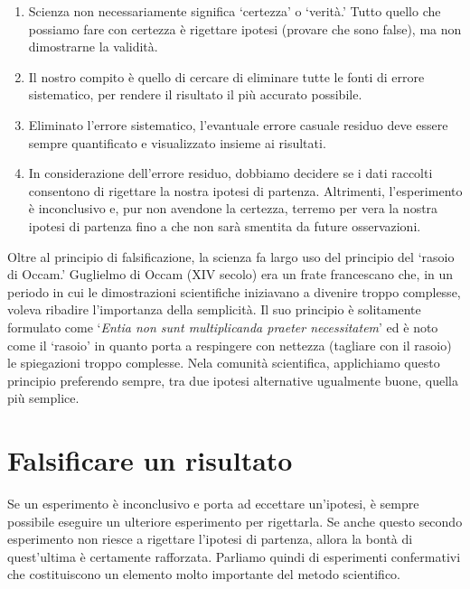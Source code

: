 \documentclass[a4paper,12pt,oneside]{book}
\providecommand{\tightlist}{%
  \setlength{\itemsep}{0pt}\setlength{\parskip}{0pt}}
\begin{document}
\begin{enumerate}
\def\labelenumi{\arabic{enumi}.}
\tightlist
\item
  Scienza non necessariamente significa `certezza' o `verità.' Tutto quello che possiamo fare con certezza è rigettare ipotesi (provare che sono false), ma non dimostrarne la validità.
\item
  Il nostro compito è quello di cercare di eliminare tutte le fonti di errore sistematico, per rendere il risultato il più accurato possibile.
\item
  Eliminato l'errore sistematico, l'evantuale errore casuale residuo deve essere sempre quantificato e visualizzato insieme ai risultati.
\item
  In considerazione dell'errore residuo, dobbiamo decidere se i dati raccolti consentono di rigettare la nostra ipotesi di partenza. Altrimenti, l'esperimento è inconclusivo e, pur non avendone la certezza, terremo per vera la nostra ipotesi di partenza fino a che non sarà smentita da future osservazioni.
\end{enumerate}

Oltre al principio di falsificazione, la scienza fa largo uso del principio del `rasoio di Occam.' Guglielmo di Occam (XIV secolo) era un frate francescano che, in un periodo in cui le dimostrazioni scientifiche iniziavano a divenire troppo complesse, voleva ribadire l'importanza della semplicità. Il suo principio è solitamente formulato come `\emph{Entia non sunt multiplicanda praeter necessitatem}' ed è noto come il `rasoio' in quanto porta a respingere con nettezza (tagliare con il rasoio) le spiegazioni troppo complesse. Nela comunità scientifica, applichiamo questo principio preferendo sempre, tra due ipotesi alternative ugualmente buone, quella più semplice.

\hypertarget{falsificare-un-risultato}{%
\section{Falsificare un risultato}\label{falsificare-un-risultato}}

Se un esperimento è inconclusivo e porta ad eccettare un'ipotesi, è sempre possibile eseguire un ulteriore esperimento per rigettarla. Se anche questo secondo esperimento non riesce a rigettare l'ipotesi di partenza, allora la bontà di quest'ultima è certamente rafforzata. Parliamo quindi di esperimenti confermativi che costituiscono un elemento molto importante del metodo scientifico.
\end{document}
